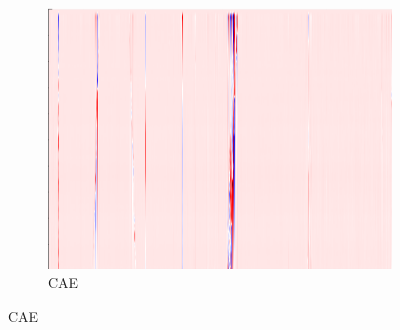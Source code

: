\begin{figure}[h]
\begin{subfigure}{0.33\textwidth}
        \includegraphics[width=\textwidth]{figures/test.png}
        \caption{CAE}
    \end{subfigure}
    
    \vspace{1em}
    

\end{figure}
